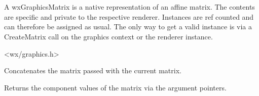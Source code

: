 
\section{}\label{wxgraphicsmatrix}

A wxGraphicsMatrix is a native representation of an affine matrix. The contents are specific and private to the respective renderer. Instances are ref counted and can therefore be assigned as usual. The only way to get a valid instance is via a CreateMatrix call on the graphics context or the renderer instance.




<wx/graphics.h>


\label{wxgraphicsmatrixconcat}


Concatenates the matrix passed with the current matrix.



\label{wxgraphicsmatrixget}


Returns the component values of the matrix via the argument pointers.

\label{wxgraphicsmatrixgetnativematrix}


